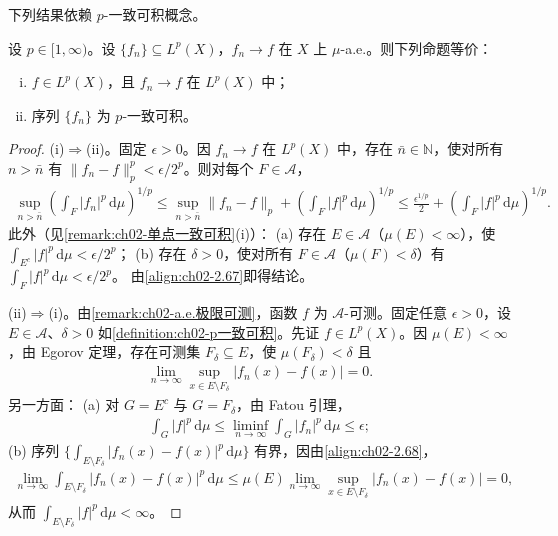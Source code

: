 \documentclass[../../main.tex]{subfiles}%
\begin{document}
下列结果依赖 $p$-一致可积概念。

\begin{theorem}[Vitali]\label{theorem:ch02-Vitali}
设 $p\in[1,\infty)$。设 $\{f_n\}\subseteq L^p(X)$，$f_n\to f$ 在 $X$ 上 $\mu$-a.e.。则下列命题等价：
\begin{enumerate}[(i)]
\item $f\in L^p(X)$，且 $f_n\to f$ 在 $L^p(X)$ 中；
\item 序列 $\{f_n\}$ 为 $p$-一致可积。
\end{enumerate}
\end{theorem}

\begin{proof}
(i)$\Rightarrow$(ii)。固定 $\epsilon>0$。因 $f_n\to f$ 在 $L^p(X)$ 中，存在 $\bar n\in\mathbb N$，使对所有 $n>\bar n$ 有 $\|f_n-f\|_p^p<\epsilon/2^p$。则对每个 $F\in\mathscr A$，
\begin{align}
\sup_{n>\bar n}\left(\int_F|f_n|^p\,\mathrm{d}\mu\right)^{1/p}
\leqslant\sup_{n>\bar n}\|f_n-f\|_p+\left(\int_F|f|^p\,\mathrm{d}\mu\right)^{1/p}
\leqslant\frac{\epsilon^{1/p}}2+\left(\int_F|f|^p\,\mathrm{d}\mu\right)^{1/p}. \label{align:ch02-2.67}
\end{align}
此外（见\cref{remark:ch02-单点一致可积}(i)）：
(a) 存在 $E\in\mathscr A$（$\mu(E)<\infty$），使 $\int_{E^c}|f|^p\,\mathrm{d}\mu<\epsilon/2^p$；
(b) 存在 $\delta>0$，使对所有 $F\in\mathscr A$（$\mu(F)<\delta$）有 $\int_F|f|^p\,\mathrm{d}\mu<\epsilon/2^p$。
由\eqref{align:ch02-2.67}即得结论。

(ii)$\Rightarrow$(i)。由\cref{remark:ch02-a.e.极限可测}，函数 $f$ 为 $\mathscr A$-可测。固定任意 $\epsilon>0$，设 $E\in\mathscr A$、$\delta>0$ 如\cref{definition:ch02-p一致可积}。先证 $f\in L^p(X)$。因 $\mu(E)<\infty$，由 Egorov 定理，存在可测集 $F_\delta\subseteq E$，使 $\mu(F_\delta)<\delta$ 且
\begin{align}
\lim_{n\to\infty}\sup_{x\in E\setminus F_\delta}|f_n(x)-f(x)|=0. \label{align:ch02-2.68}
\end{align}
另一方面：
(a) 对 $G=E^c$ 与 $G=F_\delta$，由 Fatou 引理，
\begin{align*}
\int_G|f|^p\,\mathrm{d}\mu\leqslant\liminf_{n\to\infty}\int_G|f_n|^p\,\mathrm{d}\mu\leqslant\epsilon;
\end{align*}
(b) 序列 $\{\int_{E\setminus F_\delta}|f_n(x)-f(x)|^p\,\mathrm{d}\mu\}$ 有界，因由\eqref{align:ch02-2.68}，
\begin{align*}
\lim_{n\to\infty}\int_{E\setminus F_\delta}|f_n(x)-f(x)|^p\,\mathrm{d}\mu
\leqslant\mu(E)\lim_{n\to\infty}\sup_{x\in E\setminus F_\delta}|f_n(x)-f(x)|=0,
\end{align*}
从而 $\int_{E\setminus F_\delta}|f|^p\,\mathrm{d}\mu<\infty$。


\end{proof}
\end{document}

